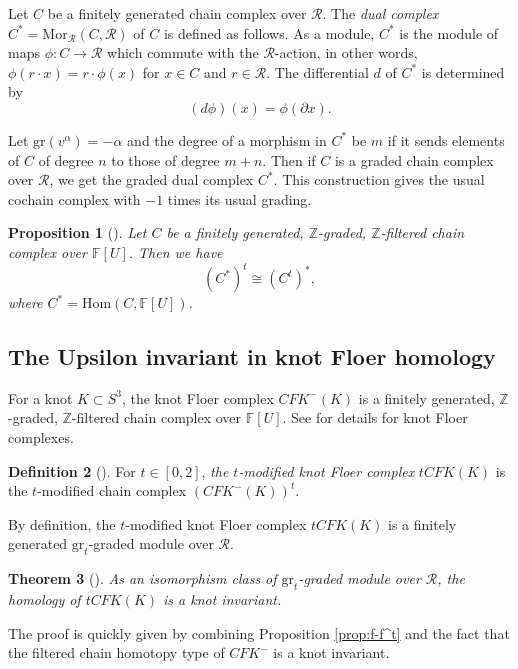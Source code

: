 \documentclass[12pt]{amsart}
\theoremstyle{plain}
\newtheorem{thm}{Theorem}[section]
\theoremstyle{definition}
\newtheorem{dfn}[thm]{Definition}
\theoremstyle{plain}
\newtheorem{prop}[thm]{Proposition}
\theoremstyle{definition}
\newcommand{\Z}{\mathbb{Z}}
\numberwithin{equation}{section}
\begin{document}
Let $C$ be a finitely generated chain complex over $\mathcal{R}$.
The \textit{dual complex} $C^*=\mathrm{Mor}_{\mathcal{R}}(C,\mathcal{R})$ of $C$ is defined as follows.
As a module, $C^*$ is the module of maps $\phi\colon C\to\mathcal{R}$ which commute with the $\mathcal{R}$-action, in other words, $\phi(r\cdot x)=r\cdot \phi(x)$ for $x\in C$ and $r\in\mathcal{R}$.
The differential $d$ of $C^*$ is determined by
\[
(d\phi)(x)=\phi(\partial x).
\]

Let $\mathrm{gr}(v^\alpha)=-\alpha$ and the degree of a morphism in $C^*$ be $m$ if it sends elements of $C$ of degree $n$ to those of degree $m+n$.
Then if $C$ is a graded chain complex over $\mathcal{R}$, we get the graded dual complex $C^*$.
This construction gives the usual cochain complex with $-1$ times its usual grading.


\begin{prop}[{\cite[Proposition 4.5]{Concordance-homomorphisms-from-knot-Floer-homology}}]
Let $C$ be a finitely generated, $\Z$-graded, $\Z$-filtered chain complex over $\mathbb{F}[U]$.
Then we have
\[
(C^*)^t\cong (C^t)^*,
\]
where $C^*=\mathrm{Hom}(C,\mathbb{F}[U])$.
\end{prop}



\subsection{The Upsilon invariant in knot Floer homology}
For a knot $K\subset S^3$, the knot Floer complex $CFK^-(K)$ is a finitely generated, $\Z$-graded, $\Z$-filtered chain complex over $\mathbb{F}[U]$.
See \cite{Holomorphic-disks-and-knot-invariants} for details for knot Floer complexes.

\begin{dfn}[{\cite[Definition 3.4]{Concordance-homomorphisms-from-knot-Floer-homology}}]
For $t\in[0,2]$, \textit{the $t$-modified knot Floer complex} $tCFK(K)$ is the $t$-modified chain complex $(CFK^-(K))^t$.
\end{dfn}
By definition, the $t$-modified knot Floer complex $tCFK(K)$ is a finitely generated $\mathrm{gr}_t$-graded module over $\mathcal{R}$.

\begin{thm}[{\cite[Theorem 3.5]{Concordance-homomorphisms-from-knot-Floer-homology}}]
As an isomorphism class of $\mathrm{gr}_t$-graded module over $\mathcal{R}$, the homology of $tCFK(K)$ is a knot invariant.
\end{thm}
The proof is quickly given by combining Proposition \ref{prop:f-f^t} and the fact that the filtered chain homotopy type of $CFK^-$ is a knot invariant.
\end{document}
